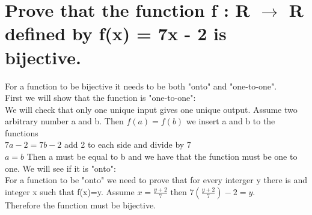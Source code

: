 \section{Prove that the function f : R $\rightarrow$ R defined by f(x) = 7x - 2 is bijective.}
For a function to be bijective it needs to be both "onto" and "one-to-one".\\
First we will show that the function is "one-to-one":\\
We will check that only one unique input gives one unique output. Assume two arbitrary number a and b. Then $f(a)=f(b)$ we insert a and b to the functions\\
$7a-2=7b-2$ add 2 to each side and divide by 7\\
$a=b$ Then a must be equal to b and we have that the function must be one to one.
We will see if it is "onto":\\
For a function to be "onto" we need to prove that for every interger y there is and integer x such that f(x)=y. Assume $x=\frac{y+2}{7}$ then $7(\frac{y+2}{7})-2=y$.\\
Therefore the function must be bijective.
\newpage
